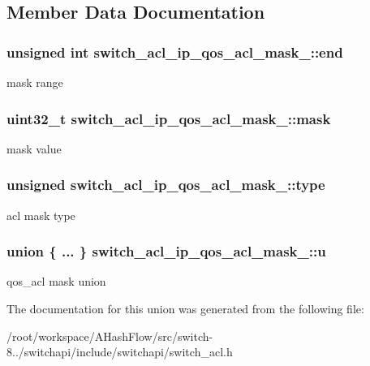 \subsection{Member Data Documentation}
\hypertarget{unionswitch__acl__ip__qos__acl__mask___a1fd5524f10481932df909a6de710f0ff}{
\subsubsection[{end}]{\setlength{\rightskip}{0pt plus 5cm}unsigned int switch\+\_\+acl\+\_\+ip\+\_\+qos\+\_\+acl\+\_\+mask\+\_\+\+::end}}\label{unionswitch__acl__ip__qos__acl__mask___a1fd5524f10481932df909a6de710f0ff}
mask range \hypertarget{unionswitch__acl__ip__qos__acl__mask___aadd7c8dbb2ab22771a45b8eae00b514b}{
\subsubsection[{mask}]{\setlength{\rightskip}{0pt plus 5cm}uint32\+\_\+t switch\+\_\+acl\+\_\+ip\+\_\+qos\+\_\+acl\+\_\+mask\+\_\+\+::mask}}\label{unionswitch__acl__ip__qos__acl__mask___aadd7c8dbb2ab22771a45b8eae00b514b}
mask value \hypertarget{unionswitch__acl__ip__qos__acl__mask___aa94a9719ab9da0c0d876427a73b12757}{
\subsubsection[{type}]{\setlength{\rightskip}{0pt plus 5cm}unsigned switch\+\_\+acl\+\_\+ip\+\_\+qos\+\_\+acl\+\_\+mask\+\_\+\+::type}}\label{unionswitch__acl__ip__qos__acl__mask___aa94a9719ab9da0c0d876427a73b12757}
acl mask type \hypertarget{unionswitch__acl__ip__qos__acl__mask___afb24a94155b6eadc71d11053b65812c9}{
\subsubsection[{u}]{\setlength{\rightskip}{0pt plus 5cm}union \{ ... \}   switch\+\_\+acl\+\_\+ip\+\_\+qos\+\_\+acl\+\_\+mask\+\_\+\+::u}}\label{unionswitch__acl__ip__qos__acl__mask___afb24a94155b6eadc71d11053b65812c9}
qos\+\_\+acl mask union 

The documentation for this union was generated from the following file\+:\begin{DoxyCompactItemize}
\item 
/root/workspace/\+A\+Hash\+Flow/src/switch-\/8../switchapi/include/switchapi/switch\+\_\+acl.\+h\end{DoxyCompactItemize}
